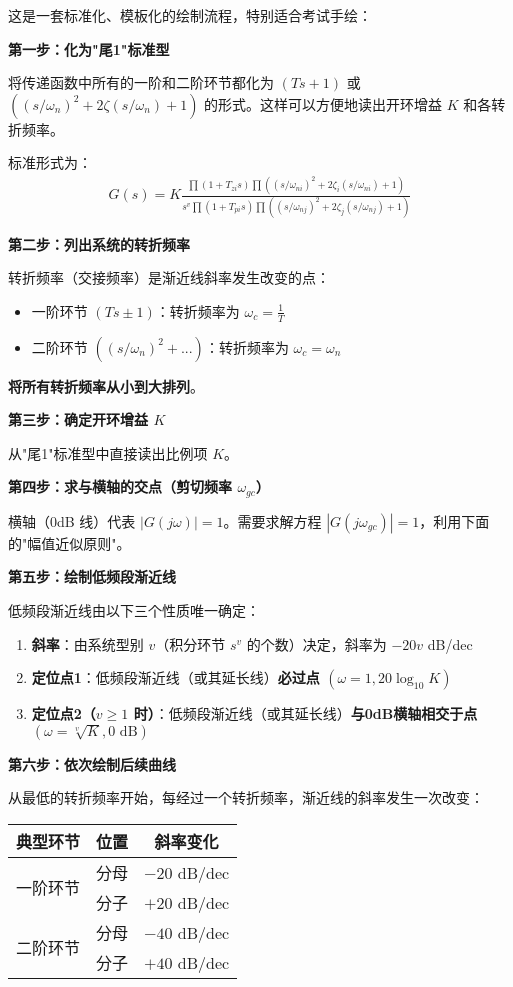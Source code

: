 这是一套标准化、模板化的绘制流程，特别适合考试手绘：

\textbf{第一步：化为"尾1"标准型}

将传递函数中所有的一阶和二阶环节都化为 $(Ts+1)$ 或 $((s/\omega_n)^2 + 2\zeta(s/\omega_n) + 1)$ 的形式。这样可以方便地读出开环增益 $K$ 和各转折频率。

标准形式为：
\begin{align*}
G(s) = K \frac{\prod(1+T_{zi}s)\prod((s/\omega_{ni})^2+2\zeta_i(s/\omega_{ni})+1)}{s^v\prod(1+T_{pi}s)\prod((s/\omega_{nj})^2+2\zeta_j(s/\omega_{nj})+1)}
\end{align*}

\textbf{第二步：列出系统的转折频率}

转折频率（交接频率）是渐近线斜率发生改变的点：
\begin{itemize}
    \item 一阶环节 $(Ts \pm 1)$：转折频率为 $\omega_c = \frac{1}{T}$
    \item 二阶环节 $((s/\omega_n)^2 + ...)$：转折频率为 $\omega_c = \omega_n$
\end{itemize}

\textbf{将所有转折频率从小到大排列}。

\textbf{第三步：确定开环增益 $K$}

从"尾1"标准型中直接读出比例项 $K$。

\textbf{第四步：求与横轴的交点（剪切频率 $\omega_{gc}$）}

横轴（0dB 线）代表 $|G(j\omega)| = 1$。需要求解方程 $|G(j\omega_{gc})| = 1$，利用下面的"幅值近似原则"。

\textbf{第五步：绘制低频段渐近线}

低频段渐近线由以下三个性质唯一确定：
\begin{enumerate}
    \item \textbf{斜率}：由系统型别 $v$（积分环节 $s^v$ 的个数）决定，斜率为 $-20v$ dB/dec
    \item \textbf{定位点1}：低频段渐近线（或其延长线）\textbf{必过点 $(\omega=1, 20\log_{10}K)$}
    \item \textbf{定位点2（$v \geq 1$ 时）}：低频段渐近线（或其延长线）\textbf{与0dB横轴相交于点 $(\omega = \sqrt[v]{K}, 0\text{ dB})$}
\end{enumerate}

\textbf{第六步：依次绘制后续曲线}

从最低的转折频率开始，每经过一个转折频率，渐近线的斜率发生一次改变：

\begin{center}
\begin{tabular}{|c|c|c|}
\hline
\textbf{典型环节} & \textbf{位置} & \textbf{斜率变化} \\
\hline
\multirow{2}{*}{一阶环节} & 分母 & $-20$ dB/dec \\
\cline{2-3}
& 分子 & $+20$ dB/dec \\
\hline
\multirow{2}{*}{二阶环节} & 分母 & $-40$ dB/dec \\
\cline{2-3}
& 分子 & $+40$ dB/dec \\
\hline
\end{tabular}
\end{center}


